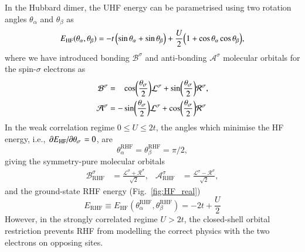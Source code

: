 \documentclass[aps,prb,reprint,noshowkeys,linenumbers,superscriptaddress]{revtex4-1}
\newcommand{\latin}[1]{#1}
\newcommand{\ie}{\latin{i.e.}}
\newcommand{\ta}{\theta_{\alpha}}
\newcommand{\tb}{\theta_{\beta}}
\newcommand{\Lsi}{\mathcal{L}^{\sigma}}
\newcommand{\Rsi}{\mathcal{R}^{\sigma}}
\begin{document}
In the Hubbard dimer, the UHF energy can be parametrised using two rotation angles $\ta$ and $\tb$ as
\begin{equation}
E_\text{HF}(\ta, \tb) = -t\, \qty( \sin \ta + \sin \tb ) + \frac{U}{2} \qty( 1 + \cos \ta \cos \tb ),
\end{equation}
where we have introduced bonding $\mathcal{B}^{\sigma}$ and anti-bonding $\mathcal{A}^{\sigma}$ molecular orbitals for 
the spin-$\sigma$ electrons as
\begin{align}
    \mathcal{B}^{\sigma} & = \hphantom{-} \cos(\frac{\theta_\sigma}{2}) \Lsi + \sin(\frac{\theta_\sigma}{2}) \Rsi,
	\\
	\mathcal{A}^{\sigma} & = - \sin(\frac{\theta_\sigma}{2}) \Lsi + \cos(\frac{\theta_\sigma}{2}) \Rsi
\end{align}
In the weak correlation regime $0 \le U \le 2t$, the angles which minimise the HF energy, 
\ie, $\pdv*{E_\text{HF}}{\theta_\sigma} = 0$, are 
\begin{equation}
	\ta^\text{RHF} = \tb^\text{RHF} = \pi/2,
\end{equation}
giving the symmetry-pure molecular orbitals
\begin{align}
	\mathcal{B}_\text{RHF}^{\sigma} & = \frac{\Lsi + \Rsi}{\sqrt{2}},
	&
	\mathcal{A}_\text{RHF}^{\sigma} & = \frac{\Lsi - \Rsi}{\sqrt{2}},
\end{align}
and the ground-state RHF energy (Fig.~\ref{fig:HF_real})
\begin{equation}
	E_\text{RHF} \equiv E_\text{HF}(\ta^\text{RHF}, \tb^\text{RHF}) = -2t + \frac{U}{2}
\end{equation}
However, in the strongly correlated regime $U>2t$, the closed-shell orbital restriction prevents RHF from 
modelling the correct physics with the two electrons on opposing sites.
\end{document}
